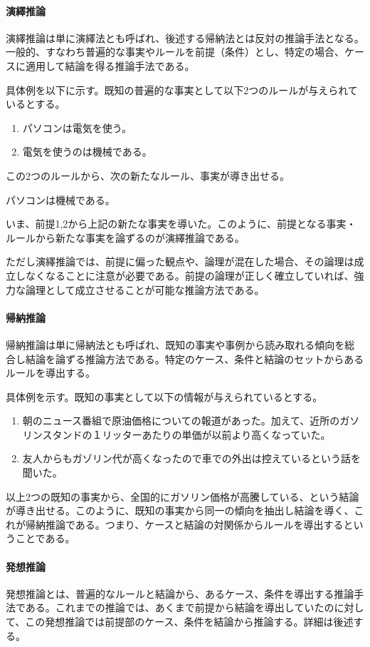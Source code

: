 \documentclass[dvipdfmx]{jsarticle}
\begin{document}
\paragraph{演繹推論}演繹推論は単に演繹法とも呼ばれ、後述する帰納法とは反対の推論手法となる。一般的、すなわち普遍的な事実やルールを前提（条件）とし、特定の場合、ケースに適用して結論を得る推論手法である。\par
具体例を以下に示す。既知の普遍的な事実として以下2つのルールが与えられているとする。
\begin{enumerate}
  \item パソコンは電気を使う。
  \item 電気を使うのは機械である。
\end{enumerate}
この2つのルールから、次の新たなルール、事実が導き出せる。
\begin{center}
  \item パソコンは機械である。
\end{center}
いま、前提1,2から上記の新たな事実を導いた。このように、前提となる事実・ルールから新たな事実を論ずるのが演繹推論である。\par
ただし演繹推論では、前提に偏った観点や、論理が混在した場合、その論理は成立しなくなることに注意が必要である。前提の論理が正しく確立していれば、強力な論理として成立させることが可能な推論方法である。
\paragraph{帰納推論}帰納推論は単に帰納法とも呼ばれ、既知の事実や事例から読み取れる傾向を総合し結論を論ずる推論方法である。特定のケース、条件と結論のセットからあるルールを導出する。\par
具体例を示す。既知の事実として以下の情報が与えられているとする。
\begin{enumerate}
  \item 朝のニュース番組で原油価格についての報道があった。加えて、近所のガソリンスタンドの１リッターあたりの単価が以前より高くなっていた。
  \item 友人からもガゾリン代が高くなったので車での外出は控えているという話を聞いた。
\end{enumerate}
以上2つの既知の事実から、全国的にガソリン価格が高騰している、という結論が導き出せる。このように、既知の事実から同一の傾向を抽出し結論を導く、これが帰納推論である。つまり、ケースと結論の対関係からルールを導出するということである。
\paragraph{発想推論}発想推論とは、普遍的なルールと結論から、あるケース、条件を導出する推論手法である。これまでの推論では、あくまで前提から結論を導出していたのに対して、この発想推論では前提部のケース、条件を結論から推論する。詳細は後述する。
\end{document}
